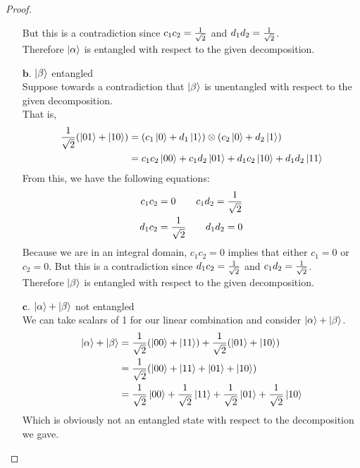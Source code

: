 \documentclass[11pt]{article}
\def\aket{\ket{\alpha}}
\def\bket{\ket{\beta}}
\def\srtt{\ensuremath\frac{1}{\sqrt{2}}}
\begin{document}
\begin{proof}
\begin{enumerate}
            But this is a contradiction since $c_1c_2 = \srtt$ and $d_1d_2 = \srtt$.  \\
        Therefore $\ket{\alpha}$ is entangled with respect to the given decomposition.
\newpage
        \item[$\textbf{b.}$] $\bket$ entangled \\
        Suppose towards a contradiction that $\bket$ is unentangled with respect to the given decomposition. \\
            That is, 
            \begin{align*}
                \srtt(\ket{01} + \ket{10}) 
                &= (c_1\ket{0} + d_1\ket{1}) \otimes (c_2\ket{0} + d_2\ket{1}) \\
                &= c_1c_2\ket{00} + c_1d_2\ket{01} + d_1c_2\ket{10} + d_1d_2\ket{11} 
            \end{align*} 
        From this, we have the following equations: 
            \begin{align*}
                c_1c_2 &= 0 & c_1d_2 = \srtt \\
                d_1c_2 &= \srtt  & d_1d_2 = 0
            \end{align*} 
            Because we are in an integral domain, $c_1c_2 = 0$ implies that either $c_1 = 0$ or $c_2 = 0$.
            But this is a contradiction since $d_1c_2 = \srtt$ and $c_1d_2 = \srtt$.  \\
        Therefore $\bket$ is entangled with respect to the given decomposition.



        \item[$\textbf{c.}$] $\aket + \bket$ not entangled \\
            We can take scalars of 1 for our linear combination and consider $\aket + \bket$.
            \begin{align*}
                \aket + \bket &= \srtt(\ket{00} + \ket{11}) + \srtt(\ket{01} + \ket{10}) \\
                &= \srtt(\ket{00} + \ket{11} + \ket{01} + \ket{10}) \\
                &= \srtt\ket{00} + \srtt\ket{11} + \srtt\ket{01} + \srtt\ket{10}
            \end{align*}
        Which is obviously not an entangled state with respect to the decomposition we gave.
    \end{enumerate}
\end{proof}
\newpage

\end{document}
